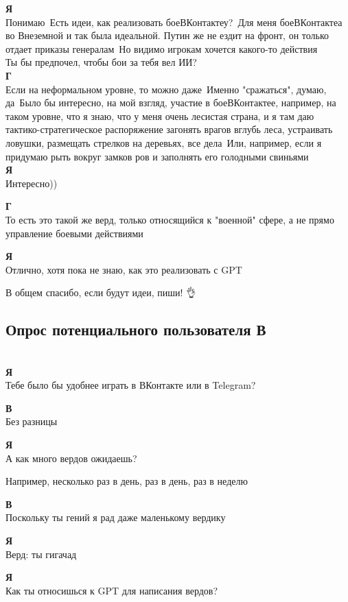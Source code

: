 \textbf{Я}\\
Понимаю\
Есть идеи, как реализовать боеВКонтактеу?\
Для меня боеВКонтактеа во Внеземной и так была идеальной. Путин же не ездит на фронт, он только отдает приказы генералам\
Но видимо игрокам хочется какого-то действия\\
Ты бы предпочел, чтобы бои за тебя вел ИИ?\\

\textbf{Г}\\
Если на неформальном уровне, то можно даже\
Именно "сражаться", думаю, да\
Было бы интересно, на мой взгляд, участие в боеВКонтактее, например, на таком уровне, что я знаю, что у меня очень лесистая страна, и я там даю тактико-стратегическое распоряжение загонять врагов вглубь леса, устраивать ловушки, размещать стрелков на деревьях, все дела\
Или, например, если я придумаю рыть вокруг замков ров и заполнять его голодными свиньями\\

\textbf{Я}\\
Интересно))

\textbf{Г}\\
То есть это такой же верд, только относящийся к "военной" сфере, а не прямо управление боевыми действиями

\textbf{Я}\\
Отлично, хотя пока не знаю, как это реализовать с GPT

В общем спасибо, если будут идеи, пиши! 👌

\subsection{Опрос потенциального пользователя В}\\
\textbf{Я}\\
Тебе было бы удобнее играть в ВКонтакте или в Telegram?

\textbf{В}\\
Без разницы

\textbf{Я}\\
А как много вердов ожидаешь?

Например, несколько раз в день, раз в день, раз в неделю

\textbf{В}\\
Поскольку ты гений я рад даже маленькому вердику

\textbf{Я}\\
Верд: ты гигачад

\textbf{Я}\\
Как ты относишься к GPT для написания вердов?

